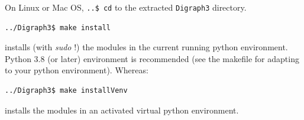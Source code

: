On Linux or Mac OS, \texttt{..\$ cd} to the extracted \texttt{Digraph3} directory.
\begin{footnotesize}
\begin{verbatim}
../Digraph3$ make install
\end{verbatim}
\end{footnotesize}
installs (with \emph{sudo} !) the \Digraph modules in the current running python environment. Python 3.8 (or later) environment is recommended (see the makefile for adapting to your python environment). Whereas:
\begin{footnotesize}
\begin{verbatim}
../Digraph3$ make installVenv
\end{verbatim}          
\end{footnotesize}
installs the \Digraph modules in an activated virtual python environment.


